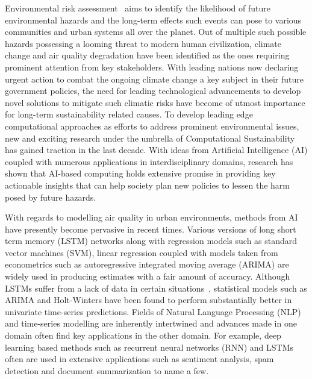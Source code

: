 \documentclass[twocolumn]{svjour3}          %
\begin{document}
Environmental risk assessment~\cite{Jones.2001} aims to identify the likelihood of future environmental hazards and the long-term effects such events can pose to various communities and urban systems all over the planet. Out of multiple such possible hazards possessing a looming threat to modern human civilization, climate change and air quality degradation have been identified as the ones requiring prominent attention from key stakeholders. With leading nations now declaring urgent action to combat the ongoing climate change a key subject in their future government policies\cite{UN.2015}, the need for leading technological advancements to develop novel solutions to mitigate such climatic risks have become of utmost importance for long-term sustainability related causes. To develop leading edge computational approaches as efforts to address prominent environmental issues, new and exciting research under the umbrella of Computational Sustainability~\cite{Gomes.2019} has gained traction in the last decade. With ideas from Artificial Intelligence (AI) coupled with numerous applications in interdisciplinary domains, research has shown that AI-based computing holds extensive promise in providing key actionable insights that can help society plan new policies to lessen the harm posed by future hazards.

With regards to modelling air quality in urban environments, methods from AI have presently become pervasive in recent times. Various versions of long short term memory (LSTM) networks along with regression models such as standard vector machines (SVM), linear regression coupled with models taken from econometrics such as autoregressive integrated moving average (ARIMA) are widely used in producing estimates with a fair amount of accuracy. Although LSTMs suffer from a lack of data in certain situations~\cite{Nath.2021}, statistical models such as ARIMA and Holt-Winters have been found to perform substantially better in univariate time-series predictions. Fields of Natural Language Processing (NLP) and time-series modelling are inherently intertwined and advances made in one domain often find key applications in the other domain. For example, deep learning based methods such as recurrent neural networks (RNN) and LSTMs often are used in extensive applications such as sentiment analysis, spam detection and document summarization to name a few.
\end{document}
